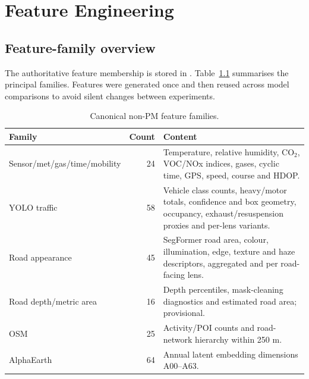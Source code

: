 \documentclass[11pt,a4paper,oneside]{report}
\begin{document}
\chapter{Feature Engineering}

\section{Feature-family overview}
The authoritative feature membership is stored in
.
Table~\ref{tab:families} summarises the principal families. Features were
generated once and then reused across model comparisons to avoid silent changes
between experiments.

\begin{table}[H]
  \centering
  \caption{Canonical non-PM feature families.}
  \label{tab:families}
  \begin{tabularx}{\textwidth}{l r X}
    \toprule
    Family & Count & Content\\
    \midrule
    Sensor/met/gas/time/mobility & 24 &
      Temperature, relative humidity, CO$_2$, VOC/NOx indices, gases,
      cyclic time, GPS, speed, course and HDOP.\\
    YOLO traffic & 58 &
      Vehicle class counts, heavy/motor totals, confidence and box geometry,
      occupancy, exhaust/resuspension proxies and per-lens variants.\\
    Road appearance & 45 &
      SegFormer road area, colour, illumination, edge, texture and haze
      descriptors, aggregated and per road-facing lens.\\
    Road depth/metric area & 16 &
      Depth percentiles, mask-cleaning diagnostics and estimated road area;
      provisional.\\
    OSM & 25 &
      Activity/POI counts and road-network hierarchy within 250 m.\\
    AlphaEarth & 64 &
      Annual latent embedding dimensions A00--A63.\\
    \bottomrule
  \end{tabularx}
\end{table}
\end{document}
